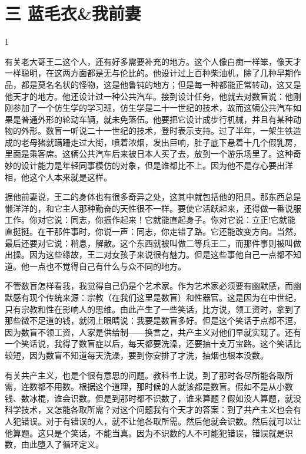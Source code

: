 \section{三 蓝毛衣\&我前妻}

1 

有关老大哥王二这个人，还有好多需要补充的地方。这个人像白痴一样笨，像天才一样聪明，在这两方面都是无与伦比的。他设计过上百种柴油机，除了几种早期作品，都是莫名名状的怪物，这是他鲁钝的地方；但是每一种都能正常转动，这又是他天才的地方。他还设计过一种公共汽车。接到设计任务，他就去对数盲说：他刚刚参加了一个仿生学的学习班，仿生学是二十一世纪的技术，故而这辆公共汽车如果是普通外形的轮动车辆，就未免落伍。他要把它设计成步行机械，并且有某种动物的外形。数盲一听说二十一世纪的技术，登时表示支持。过了半年，一架生铁造成的老母猪就蹒跚走过大街，喷着浓烟，发出巨响，肚子底下悬着十几个假乳房，里面是乘客席。这辆公共汽车后来被日本人买了去，放到一个游乐场里了。这种奇妙的设计能力是年轻同事模仿的对象，但是谁都比不上。因为他不是存心要出洋相，他这个人本来就是这样。 

据他前妻说，王二的身体也有很多奇异之处，这其中就包括他的阳具。那东西总是懒洋洋的，和它主人那种勤奋的天性很不一样。要使它活跃起来，还得做一番说服工作。你对它说：同志，你振作起来！它就能直起身子。你对它说：立正!它就能直挺挺。在干那件事时，你说一声：同志，你走错了路。它还能改变方向。当然，最后还要对它说：稍息，解散。这个东西就被叫做二等兵王二，而那件事则被叫做出操。因为这些缘故，王二对女孩子来说很有魅力。但是这些事他自己一点都不知道。他一点也不觉得自己有什么与众不同的地方。 



不管数盲怎样看我，我觉得自己仍是个艺术家。作为艺术家必须要有幽默感，而幽默感有现个传统来源：宗教（在我们这里是数盲）和性器官。这是因为在中世纪，只有宗教和性在影响人的思维。由此产生了一些笑话，比方说，领工资时，拿到了那些微不足道的钱，就闭上眼睛说：我要是数盲多好。但是这个笑话于点都不逗，因为数盲不领工资，人家是供给制——换言之，共产主义对他们早就实现了。还有一个笑话说，我得了数盲症以后，每天都要洗澡，还要抽十支万宝路。这个笑话比较短，因为数盲不知道每天洗澡，要到你安排了才洗，抽烟也根本没数。 

有关共产主义，也是个很有意思的问题。教科书上说，到了那时各尽所能各取所需，连数都不用数。根据这个道理，那时候的人就该都是数盲。假如不是从小数钱、数冰棍，谁会识数。但是到那时都不识数了，谁来算题？假如没人算题，就没科学技术，又怎能各取所需？对这个问题我有个天才的答案：到了共产主义也会有人犯错误。对于有错误的人，就不让他各取所需。然后他就会识数。然后就可以让他算题。这只是个笑话，不能当真。因为不识数的人不可能犯错误，错误就是识数，由此堕入了循环定义。 


